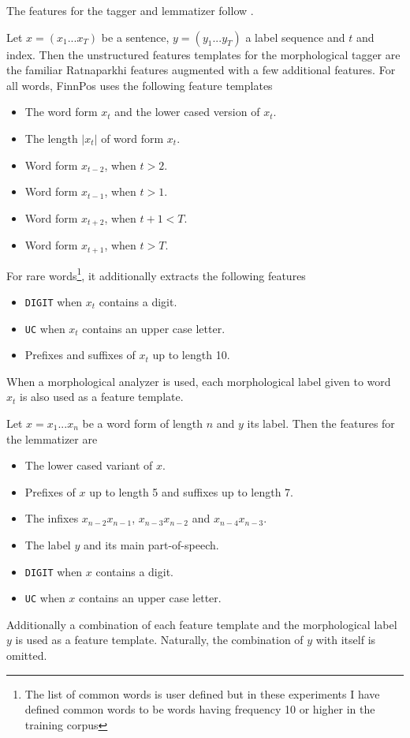 The features for the tagger and lemmatizer follow
\cite{Silfverberg2015}.

Let $x = (x_1 ... x_T)$ be a sentence, $y = (y_1 ... y_T)$ a label
sequence and $t$ and index. Then the unstructured features templates
for the morphological tagger are the familiar Ratnaparkhi features
\citep{Ratnaparkhi1998} augmented with a few additional features. For
all words, FinnPos uses the following feature templates
\begin{itemize}
\item The word form $x_t$ and the lower cased version of $x_t$.
\item The length $|x_t|$ of word form $x_t$.
\item Word form $x_{t-2}$, when $t > 2$.
\item Word form $x_{t-1}$, when $t > 1$.
\item Word form $x_{t+2}$, when $t + 1 < T$.
\item Word form $x_{t+1}$, when $t > T$.
\end{itemize}
For rare words\footnote{The list of common words is user defined but
  in these experiments I have defined common words to be words having
  frequency 10 or higher in the training corpus}, it additionally
extracts the following features
\begin{itemize}
\item {\tt DIGIT} when $x_t$ contains a digit.
\item {\tt UC} when $x_t$ contains an upper case letter.
\item Prefixes and suffixes of $x_t$ up to length 10.
\end{itemize}
When a morphological analyzer is used, each morphological label given
to word $x_t$ is also used as a feature template.

Let $x = x_1 ... x_n$ be a word form of length $n$ and $y$ its
label. Then the features for the lemmatizer are
\begin{itemize}
\item The lower cased variant of $x$.
\item Prefixes of $x$ up to length 5 and suffixes up to length 7.
\item The infixes $x_{n - 2}x_{n - 1}$, $x_{n - 3}x_{n - 2}$ and $x_{n - 4}x_{n - 3}$.
\item The label $y$ and its main part-of-speech.
\item {\tt DIGIT} when $x$ contains a digit.
\item {\tt UC} when $x$ contains an upper case letter.
\end{itemize}
Additionally a combination of each feature template and the
morphological label $y$ is used as a feature template. Naturally, the
combination of $y$ with itself is omitted.

